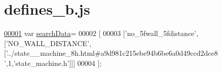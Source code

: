 \hypertarget{defines__b_8js_source}{}\section{defines\+\_\+b.\+js}
\label{defines__b_8js_source}

\begin{DoxyCode}
\hypertarget{defines__b_8js_source.tex_l00001}{}\hyperlink{defines__b_8js_ad01a7523f103d6242ef9b0451861231e}{00001} var \hyperlink{defines__b_8js_ad01a7523f103d6242ef9b0451861231e}{searchData}=
00002 [
00003   [\textcolor{stringliteral}{'no\_5fwall\_5fdistance'},[\textcolor{stringliteral}{'NO\_WALL\_DISTANCE'},[\textcolor{stringliteral}{'../state\_\_machine\_8h.html#a9d981c215ebe94b6be6a0d49ccd2dce8
      '},1,\textcolor{stringliteral}{'state\_machine.h'}]]]
00004 ];
\end{DoxyCode}
